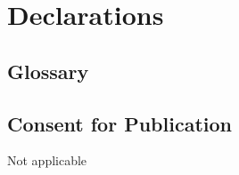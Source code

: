 \documentclass[a4paper,num-refs,numbers,sort&compress]{de-rse}
\begin{document}
\section{Declarations}

\subsection{Glossary}\label{subsec:glossary}

\printglossaries









\subsection{Consent for Publication}

Not applicable

\end{document}
